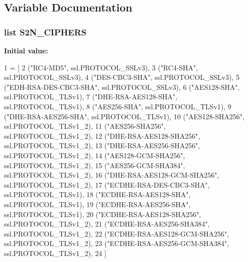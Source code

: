 \subsection{Variable Documentation}
\subsubsection[{\texorpdfstring{S2\+N\+\_\+\+C\+I\+P\+H\+E\+RS}{S2N_CIPHERS}}]{\setlength{\rightskip}{0pt plus 5cm}list S2\+N\+\_\+\+C\+I\+P\+H\+E\+RS}\hypertarget{namespaces2n__handshake__test_adbfecdf840887c5e82f08e23e9d9430f}{}\label{namespaces2n__handshake__test_adbfecdf840887c5e82f08e23e9d9430f}
{\bfseries Initial value\+:}
\begin{DoxyCode}
1 = [
2     (\textcolor{stringliteral}{"RC4-MD5"}, ssl.PROTOCOL\_SSLv3),
3     (\textcolor{stringliteral}{"RC4-SHA"}, ssl.PROTOCOL\_SSLv3),
4     (\textcolor{stringliteral}{"DES-CBC3-SHA"}, ssl.PROTOCOL\_SSLv3),
5     (\textcolor{stringliteral}{"EDH-RSA-DES-CBC3-SHA"}, ssl.PROTOCOL\_SSLv3),
6     (\textcolor{stringliteral}{"AES128-SHA"}, ssl.PROTOCOL\_TLSv1),
7     (\textcolor{stringliteral}{"DHE-RSA-AES128-SHA"}, ssl.PROTOCOL\_TLSv1),
8     (\textcolor{stringliteral}{"AES256-SHA"}, ssl.PROTOCOL\_TLSv1),
9     (\textcolor{stringliteral}{"DHE-RSA-AES256-SHA"}, ssl.PROTOCOL\_TLSv1),
10     (\textcolor{stringliteral}{"AES128-SHA256"}, ssl.PROTOCOL\_TLSv1\_2),
11     (\textcolor{stringliteral}{"AES256-SHA256"}, ssl.PROTOCOL\_TLSv1\_2),
12     (\textcolor{stringliteral}{"DHE-RSA-AES128-SHA256"}, ssl.PROTOCOL\_TLSv1\_2),
13     (\textcolor{stringliteral}{"DHE-RSA-AES256-SHA256"}, ssl.PROTOCOL\_TLSv1\_2),
14     (\textcolor{stringliteral}{"AES128-GCM-SHA256"}, ssl.PROTOCOL\_TLSv1\_2),
15     (\textcolor{stringliteral}{"AES256-GCM-SHA384"}, ssl.PROTOCOL\_TLSv1\_2),
16     (\textcolor{stringliteral}{"DHE-RSA-AES128-GCM-SHA256"}, ssl.PROTOCOL\_TLSv1\_2),
17     (\textcolor{stringliteral}{"ECDHE-RSA-DES-CBC3-SHA"}, ssl.PROTOCOL\_TLSv1),
18     (\textcolor{stringliteral}{"ECDHE-RSA-AES128-SHA"}, ssl.PROTOCOL\_TLSv1),
19     (\textcolor{stringliteral}{"ECDHE-RSA-AES256-SHA"}, ssl.PROTOCOL\_TLSv1),
20     (\textcolor{stringliteral}{"ECDHE-RSA-AES128-SHA256"}, ssl.PROTOCOL\_TLSv1\_2),
21     (\textcolor{stringliteral}{"ECDHE-RSA-AES256-SHA384"}, ssl.PROTOCOL\_TLSv1\_2),
22     (\textcolor{stringliteral}{"ECDHE-RSA-AES128-GCM-SHA256"}, ssl.PROTOCOL\_TLSv1\_2),
23     (\textcolor{stringliteral}{"ECDHE-RSA-AES256-GCM-SHA384"}, ssl.PROTOCOL\_TLSv1\_2),
24 ]
\end{DoxyCode}


